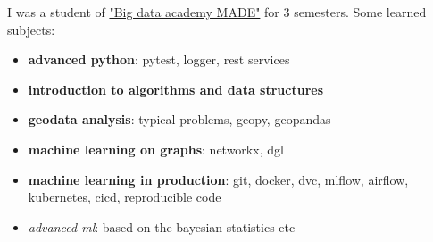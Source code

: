 \documentclass[letterpaper]{twentysecondcv} %
\begin{document}
\iffalse
\begin{twenty}
        \twentyitem
        {Sep 2020 -}{Dec 2022}{Big data academy}
        {\href{http://data.mail.ru/}{mail.ru} }{student}
        {
            {\begin{itemize}
                \item learned subjects:
                    {\begin{itemize}
                    \item \textbf{advanced python}: pytest, logger, rest services
                    \item \textbf{introduction to algorithms and data structures}
                    \item \textbf{geodata analysis}: typical problems, geopy, geopandas
                    \item \textbf{machine learning on graphs}: networkx, dgl
                    \item \textbf{machine learning in production}: git, docker, dvc, mlflow, airflow, kubernetes, cicd, reproducible code
                    \item \emph{advanced ml}: based on the bayesian statistics etc
                    \end{itemize}}

            \end{itemize}}
        }
        \\
\end{twenty}
\fi

I was a student of \href{https://data.vk.company/}{"Big data academy MADE"} for 3 semesters. Some learned subjects:
    {\begin{itemize}
        \item \textbf{advanced python}: pytest, logger, rest services
        \item \textbf{introduction to algorithms and data structures}
        \item \textbf{geodata analysis}: typical problems, geopy, geopandas
        \item \textbf{machine learning on graphs}: networkx, dgl
        \item \textbf{machine learning in production}: git, docker, dvc, mlflow, airflow, kubernetes, cicd, reproducible code
        \item \emph{advanced ml}: based on the bayesian statistics etc
    \end{itemize}
    }


\end{document}
